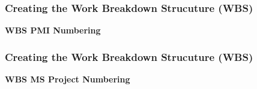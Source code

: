 \documentclass[aspectratio=169]{beamer}
\begin{document}

\begin{frame}
\frametitle{Creating the Work Breakdown Strucuture (WBS)}
\textbf{WBS PMI Numbering}
\begin{figure}
\end{figure}
\end{frame}


\begin{frame}
\frametitle{Creating the Work Breakdown Strucuture (WBS)}
\textbf{WBS MS Project Numbering}
\begin{figure}
\end{figure}
\end{frame}
\end{document}
